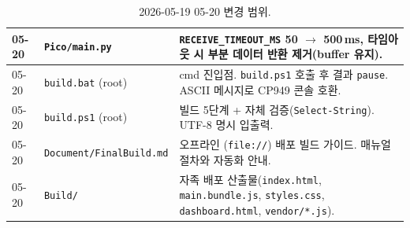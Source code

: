 \documentclass[11pt, oneside]{article}
\begin{document}
\begin{table}[h]
\begin{tabularx}{\linewidth}{@{}llX@{}}
05-20 & \texttt{Pico/main.py} & \texttt{RECEIVE\_TIMEOUT\_MS} 50 $\rightarrow$ 500\,ms, 타임아웃 시 부분 데이터 반환 제거(buffer 유지). \\
\midrule
05-20 & \texttt{build.bat} (root) & cmd 진입점. \texttt{build.ps1} 호출 후 결과 \texttt{pause}. ASCII 메시지로 CP949 콘솔 호환. \\
05-20 & \texttt{build.ps1} (root) & 빌드 5단계 + 자체 검증(\texttt{Select-String}). UTF-8 명시 입출력. \\
05-20 & \texttt{Document/FinalBuild.md} & 오프라인 (\texttt{file://}) 배포 빌드 가이드. 매뉴얼 절차와 자동화 안내. \\
05-20 & \texttt{Build/} & 자족 배포 산출물(\texttt{index.html}, \texttt{main.bundle.js}, \texttt{styles.css}, \texttt{dashboard.html}, \texttt{vendor/*.js}). \\
\bottomrule
\end{tabularx}
\caption{2026-05-19 \textendash{} 05-20 변경 범위.}
\end{table}
\end{document}
